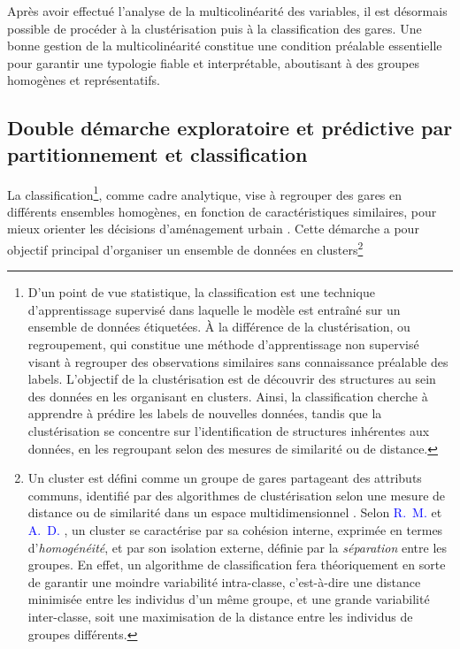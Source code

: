 \begin{refsegment}
Après avoir effectué l'analyse de la multicolinéarité des variables, il est désormais possible de procéder à la clustérisation puis à la classification des gares. Une bonne gestion de la multicolinéarité constitue une condition préalable essentielle pour garantir une typologie fiable et interprétable, aboutisant à des groupes homogènes et représentatifs.%

\subsection{Double démarche exploratoire et prédictive par partitionnement et classification
    \label{chap6:methodologie-statistiques-clusterisation-classification}
    }

La classification\footnote{
    D'un point de vue statistique, la classification est une technique d'apprentissage supervisé dans laquelle le modèle est entraîné sur un ensemble de données étiquetées. À la différence de la clustérisation, ou regroupement, qui constitue une méthode d'apprentissage non supervisé visant à regrouper des observations similaires sans connaissance préalable des labels. L'objectif de la clustérisation est de découvrir des structures au sein des données en les organisant en clusters. Ainsi, la classification cherche à apprendre à prédire les labels de nouvelles données, tandis que la clustérisation se concentre sur l'identification de structures inhérentes aux données, en les regroupant selon des mesures de similarité ou de distance.
}, comme cadre analytique, vise à regrouper des gares en différents ensembles homogènes, en fonction de caractéristiques similaires, pour mieux orienter les décisions d'aménagement urbain \textcolor{blue}{\autocite[2]{cao_coordination_2020}}. Cette démarche a pour objectif principal d'organiser un ensemble de données en clusters\footnote{
    Un cluster est défini comme un groupe de gares partageant des attributs communs, identifié par des algorithmes de clustérisation selon une mesure de distance ou de similarité dans un espace multidimensionnel \textcolor{blue}{\autocite[7]{everitt_cluster_2011}}. Selon \textcolor{blue}{R.~M.} \textcolor{blue}{\textcite[321]{cormack_review_1971}} et \textcolor{blue}{A.~D.} \textcolor{blue}{\textcite[15]{gordon_classification_1999}}, un cluster se caractérise par sa cohésion interne, exprimée en termes d'\textsl{homogénéité}, et par son isolation externe, définie par la \textsl{séparation} entre les groupes. En effet, un algorithme de classification fera théoriquement en sorte de garantir une moindre variabilité intra-classe, c'est-à-dire une distance minimisée entre les individus d'un même groupe, et une grande variabilité inter-classe, soit une maximisation de la distance entre les individus de groupes différents.
}
\end{refsegment}
